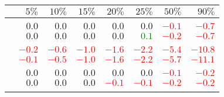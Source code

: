 \begin{center}
   \captionsetup{font=small}
  \begin{tabular}{lrrrrrrr}
    \toprule
                                & $5\%$                    & $10\%$                   & $15\%$                   & $20\%$                   & $25\%$                   & $50\%$                   & $90\%$                   \\
    \midrule
    \multicolumn{8}{c}{\aut{}} \\
    \uslpropGsecTwin{}          & $0.0$                    & $0.0$                    & $0.0$                    & $0.0$                    & $0.0$                    & \textcolor{Red}{$-0.1$}  & \textcolor{Red}{$-0.7$}  \\
    \usruleTwin{}               & $0.0$                    & $0.0$                    & $0.0$                    & $0.0$                    & \textcolor{Green}{$0.1$} & \textcolor{Red}{$-0.2$}  & \textcolor{Red}{$-0.7$}  \\
    \multicolumn{8}{c}{\adv{}} \\
    \uslpropGsecTwin{}          & \textcolor{Red}{$-0.2$}  & \textcolor{Red}{$-0.6$}  & \textcolor{Red}{$-1.0$}  & \textcolor{Red}{$-1.6$}  & \textcolor{Red}{$-2.2$}  & \textcolor{Red}{$-5.4$}  & \textcolor{Red}{$-10.8$} \\
    \usruleTwin{}               & \textcolor{Red}{$-0.1$}  & \textcolor{Red}{$-0.5$}  & \textcolor{Red}{$-1.0$}  & \textcolor{Red}{$-1.6$}  & \textcolor{Red}{$-2.2$}  & \textcolor{Red}{$-5.7$}  & \textcolor{Red}{$-11.1$} \\
    \multicolumn{8}{c}{\wik{}} \\
    \uslpropGsecTwin{}          & $0.0$                    & $0.0$                    & $0.0$                    & $0.0$                    & $0.0$                    & \textcolor{Red}{$-0.1$}  & \textcolor{Red}{$-0.2$}  \\
    \usruleTwin{}               & $0.0$                    & $0.0$                    & $0.0$                    & \textcolor{Red}{$-0.1$}  & \textcolor{Red}{$-0.1$}  & \textcolor{Red}{$-0.2$}  & \textcolor{Red}{$-0.2$}  \\
    \multicolumn{8}{c}{\sla{}} \\

\end{tabular}
\end{center}
